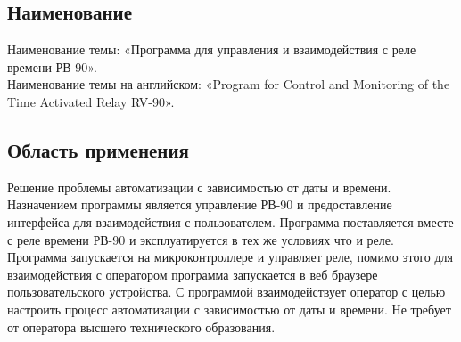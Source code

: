\subsection{Наименование}
Наименование темы: «Программа для управления и взаимодействия с реле времени РВ-90». \\
Наименование темы на английском: «Program for Control and Monitoring of the Time Activated Relay RV-90». \\

\subsection{Область применения}
Решение проблемы автоматизации с зависимостью от даты и времени.
Назначением программы является управление РВ-90 и предоставление интерфейса для взаимодействия с пользователем.
Программа поставляется вместе с реле времени РВ-90 и эксплуатируется в тех же условиях что и реле. Программа запускается на микроконтроллере и управляет реле, помимо этого для взаимодействия с оператором программа запускается в веб браузере пользовательского устройства. С программой взаимодействует оператор с целью настроить процесс автоматизации с зависимостью от даты и времени. Не требует от оператора высшего технического образования. 
